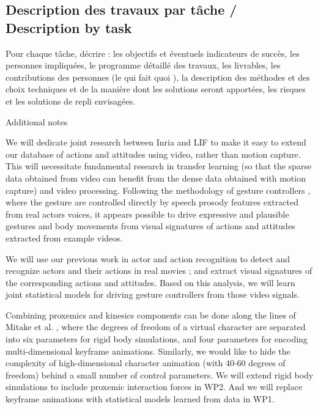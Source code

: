 
\subsection{Description des travaux par tâche / Description by task}
\begin{xcomment}  
Pour chaque tâche, d\'ecrire : 
les objectifs et \'eventuels indicateurs de succ\`es,
les personnes impliqu\'ees,
le programme d\'etaill\'e des travaux,
les livrables,
les contributions des personnes (le qui fait quoi ),
la description des m\'ethodes et des choix techniques et de la mani\`ere dont les solutions seront apport\'ees,
les risques et les solutions de repli envisag\'ees.
\end{xcomment}










Additional notes


We will dedicate joint research between Inria and LIF to make it easy to extend our database of actions and attitudes
using video, rather than motion capture. This will necessitate fundamental research in transfer learning (so that the sparse
data obtained from video can benefit from the dense data obtained with motion capture) and video processing.  Following the
methodology of  gesture controllers \cite{Levine2010}, where the gesture are controlled directly by speech prosody features
extracted from real actors voices, it appears possible to drive expressive and plausible gestures and body movements from
visual signatures of actions and attitudes extracted from example videos. 

We will use  our previous work in actor and action recognition \cite{Weinland06,Weinland07,Gandhi13} to detect and recognize
actors and their actions in real movies ; and extract visual signatures of the corresponding actions and attitudes. Based on this
analysis, we will learn joint statistical models for driving gesture controllers from those video signals.


Combining proxemics and kinesics components can be done along the lines of Mitake et al. \cite{Mitake09}, where
the degrees of freedom of a virtual character are separated into six parameters for rigid body simulations,  and four parameters
for encoding multi-dimensional keyframe animations. Similarly, we would like to hide the complexity of high-dimensional 
character animation (with 40-60 degrees of freedom) behind a small number of control parameters. We will extend
rigid body simulations  to include proxemic interaction forces in WP2. And we will replace keyframe animations with statistical models learned from data in WP1. 

